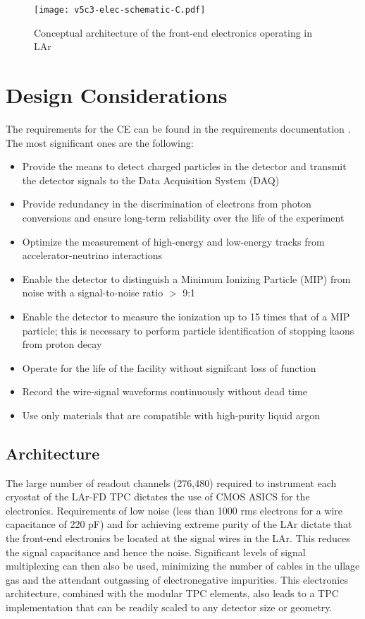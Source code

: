  
\begin{figure}[htbp]
\centering
\texttt{[image: v5c3-elec-schematic-C.pdf]}
\caption{Conceptual architecture of the front-end electronics operating in LAr}
\label{fig:tpc-elec-schematic}
\end{figure}


\section{Design Considerations} 
\label{sec:ce-reqs-n-specs}

The requirements for the CE can be found in the requirements documentation \cite{lar-fd-req}.
The most significant ones are the following:

\begin{itemize}	
\item Provide the means to detect charged particles in the detector and transmit the detector signals to the
Data Acquisition System (DAQ)
\item Provide redundancy in the discrimination of electrons from photon conversions and ensure long-term reliability
over the life of the experiment
\item Optimize the measurement of high-energy and low-energy tracks from accelerator-neutrino interactions
\item Enable the detector to distinguish a Minimum Ionizing Particle (MIP) from noise with a signal-to-noise ratio $>$ 9:1
\item Enable the detector to measure the ionization up to 15 times that of a MIP particle;
this is necessary to perform particle identification of stopping kaons from proton decay
\item Operate for the life of the facility without signifcant loss of function
\item Record the wire-signal waveforms continuously without dead time
\item Use only materials that are compatible with high-purity liquid argon

\end{itemize}



\subsection{Architecture}
\label{subsec:fe-arch}

The large number of readout channels (276,480) required to instrument
each cryostat of the LAr-FD TPC dictates the use of CMOS ASICS for the electronics. 
Requirements of low noise (less than 1000 rms electrons for a wire
capacitance of 220 pF) and for achieving extreme purity of the LAr dictate that
the front-end electronics be located at the signal wires in the LAr.  This
reduces the signal capacitance and hence the noise. Significant levels of 
signal multiplexing can then also be used, minimizing the number of cables
in the ullage gas and the attendant 
outgassing of electronegative impurities.
This electronics
architecture, combined with the modular TPC elements, also leads to a
TPC implementation that can be readily scaled to any detector size or
geometry.

